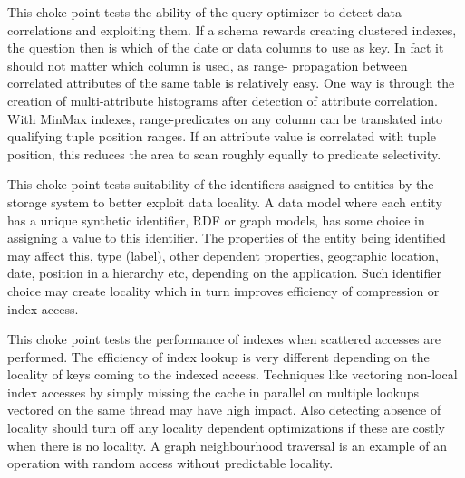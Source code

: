 This choke point tests the ability of the query optimizer to detect data correlations and exploiting them. If a schema rewards creating clustered indexes, the question then is which of the date or data columns to use as key.
In fact it should not matter which column is used, as range- propagation between correlated attributes of the same table is relatively easy. One way is through the creation of multi-attribute histograms after detection of attribute correlation.
With MinMax indexes, range-predicates on any column can be translated into qualifying tuple position ranges. If an attribute value is correlated with tuple position, this reduces the area to scan roughly equally to predicate selectivity.





This choke point tests suitability of the identifiers assigned to entities by the storage system to better exploit data locality. A data model where each entity has a unique synthetic identifier,
\eg RDF or graph models, has some choice in assigning a value to this identifier.
The properties of the entity being identified may affect this, \eg type (label), other dependent properties,
\eg geographic location, date, position in a hierarchy etc, depending on the application. Such identifier choice may create locality which in turn improves efficiency of compression or index access.





This choke point tests the performance of indexes when scattered accesses are performed. The efficiency of index lookup is very different depending on the locality of keys coming to the indexed access.
Techniques like vectoring non-local index accesses by simply missing the cache in parallel on multiple lookups vectored on the same thread may have high impact.
Also detecting absence of locality should turn off any locality dependent optimizations if these are costly when there is no locality. A graph neighbourhood traversal is an example of an operation with random access without predictable locality.




